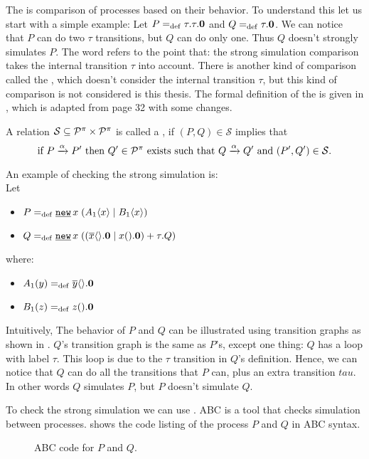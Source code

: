 The  is comparison of processes based on their behavior. To understand this let us start with a simple example:
Let $P=_{\mathrm{def}}\tau.\tau.\mathbf{0}$ and $Q=_{\mathrm{def}}\tau.\mathbf{0}$. We can notice that $P$ can do two $\tau$ transitions, but $Q$ can do only one. Thus $Q$ doesn't strongly simulates $P$. The word  refers to the point that: the strong simulation comparison takes the internal transition $\tau$ into account. There is another kind of comparison called the  , which doesn't consider the internal transition $\tau$, but this kind of comparison is not considered is this thesis. The formal definition of the  is given in , which is adapted from \cite{gieseking} page 32 with some changes.


\begin{definition}
\label{def_strong_sim}
A relation $\mathcal{S}\subseteq\mathcal P^{\pi}\times\mathcal P^{\pi}$ is called a , if $(P,Q)\in\mathcal{S}$ implies that
\[\text{if } P \xrightarrow{\alpha} P' \text{ then }Q'\in\mathcal P^{\pi} \text{ exists such that } Q \xrightarrow{\alpha} Q' \text{ and } (P',Q')\in\mathcal{S}.\]
\end{definition}

An example of checking the strong simulation is:
\\Let
\begin{itemize}
\item $P\define\procres{x}{(\procpar{\proccall{A_1}{x}}{\proccall{B_1}{x}})}$ 
\item $Q\define\procres{x}{(\procchoice{(\procpar{\out{x}{}.\proczero}{\inp{x}{}.\proczero})}{\tau.Q})}$
\end{itemize}
where:
\begin{itemize}
\item $A_1(y)=_{\mathrm{def}}{}\overline{y}\langle{}\rangle.\mathbf{0}$
\item $B_1(z)=_{\mathrm{def}}{}z({}).\mathbf{0}$
\end{itemize}

Intuitively, The behavior of $P$ and $Q$ can be illustrated using transition graphs as shown in . $Q$'s transition graph is the same as $P$'s, except one thing: $Q$ has a loop with label $\tau$. This loop is due to the $\tau$ transition in $Q$'s definition. Hence, we can notice that $Q$ can do all the transitions that $P$ can, plus an extra transition $tau$. In other words $Q$ simulates $P$, but $P$ doesn't simulate $Q$.

To check the strong simulation we can use  \cite{abc}. ABC is a tool that checks simulation between  \picalc{} processes.  shows the code listing of the process $P$ and $Q$ in ABC syntax.
\begin{figure}[ht!]

\caption{ABC code for $P$ and $Q$.}
\label{pi_simulation_ABC_code}
\end{figure}

